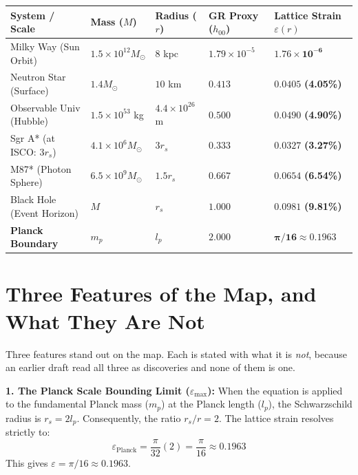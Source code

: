 \documentclass[11pt, letterpaper, openany]{book}
\begin{document}
\begin{center}
\renewcommand{\arraystretch}{1.2}
\small
\begin{tabular}{|p{3.5cm}|p{2cm}|p{2.5cm}|p{2.2cm}|p{2.5cm}|}
\hline
\rowcolor{kishblue!12}
\textbf{System / Scale} & \textbf{Mass ($M$)} & \textbf{Radius ($r$)} & \textbf{GR Proxy ($h_{00}$)} & \textbf{Lattice Strain $\varepsilon(r)$} \\
\hline
Milky Way (Sun Orbit) & $1.5 \times 10^{12} M_\odot$ & $8$ kpc & $1.79 \times 10^{-5}$ & $\mathbf{1.76 \times 10^{-6}}$ \\
\hline
Neutron Star (Surface) & $1.4 M_\odot$ & $10$ km & $0.413$ & $\mathbf{0.0405}$ \textbf{(4.05\%)} \\
\hline
Observable Univ (Hubble) & $1.5 \times 10^{53}$ kg & $4.4 \times 10^{26}$ m & $0.500$ & $\mathbf{0.0490}$ \textbf{(4.90\%)} \\
\hline
Sgr A* (at ISCO: $3 r_s$) & $4.1 \times 10^6 M_\odot$ & $3 r_s$ & $0.333$ & $\mathbf{0.0327}$ \textbf{(3.27\%)} \\
\hline
M87* (Photon Sphere) & $6.5 \times 10^9 M_\odot$ & $1.5 r_s$ & $0.667$ & $\mathbf{0.0654}$ \textbf{(6.54\%)} \\
\hline
Black Hole (Event Horizon) & $M$ & $r_s$ & $1.000$ & $\mathbf{0.0981}$ \textbf{(9.81\%)} \\
\hline
\rowcolor{goldseal!20}
\textbf{Planck Boundary} & $m_p$ & $l_p$ & $2.000$ & $\mathbf{\pi/16 \approx 0.1963}$ \\
\hline
\end{tabular}
\end{center}

\section{Three Features of the Map, and What They Are Not}

Three features stand out on the map. Each is stated with what it is \emph{not}, because an earlier
draft read all three as discoveries and none of them is one.

\textbf{1. The Planck Scale Bounding Limit ($\varepsilon_{\text{max}}$):}
When the equation is applied to the fundamental Planck mass ($m_p$) at the Planck length ($l_p$), the Schwarzschild radius is $r_s = 2 l_p$. Consequently, the ratio $r_s/r = 2$. 
The lattice strain resolves strictly to:
\[
\varepsilon_{\text{Planck}} = \frac{\pi}{32} (2) = \frac{\pi}{16} \approx 0.1963
\]
This gives $\varepsilon = \pi/16 \approx 0.1963$.
\end{document}
